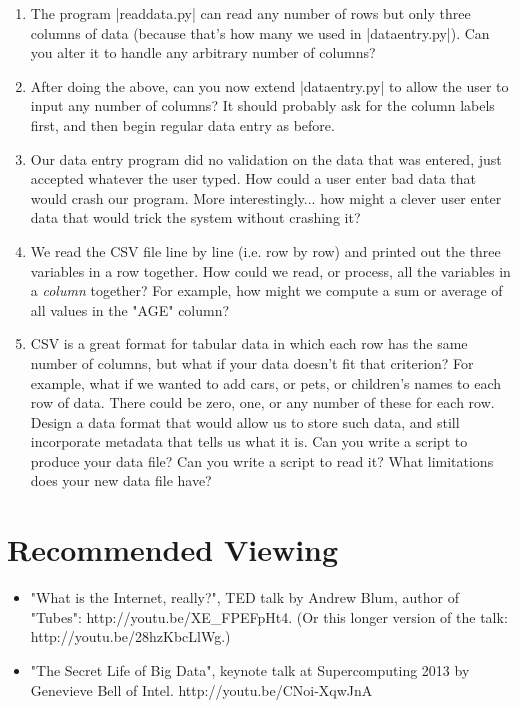 \documentclass[11pt]{book}
\begin{document}
\begin{enumerate}
    \item The program |readdata.py| can read any number of rows but only three columns of data (because that's how many we used in |dataentry.py|). Can you alter it to handle any arbitrary number of columns?
    \item After doing the above, can you now extend |dataentry.py| to allow the user to input any number of columns?  It should probably ask for the column labels first, and then begin regular data entry as before.
    \item Our data entry program did no validation on the data that was entered, just accepted whatever the user typed.  How could a user enter bad data that would crash our program.  More interestingly... how might a clever user enter data that would trick the system without crashing it?
    \item We read the CSV file line by line (i.e. row by row) and printed out the three variables in a row together.  How could we read, or process, all the variables in a \emph{column} together?  For example, how might we compute a sum or average of all values in the "AGE" column?
    \item CSV is a great format for tabular data in which each row has the same number of columns, but what if your data doesn't fit that criterion?  For example, what if we wanted to add cars, or pets, or children's names to each row of data.  There could be zero, one, or any number of these for each row.  Design a data format that would allow us to store such data, and still incorporate metadata that tells us what it is.  Can you write a script to produce your data file?  Can you write a script to read it?  What limitations does your new data file have?
\end{enumerate}

\section*{Recommended Viewing}
\begin{itemize}
    \item "What is the Internet, really?", TED talk by Andrew Blum, author of "Tubes": http://youtu.be/XE\_FPEFpHt4. (Or this longer version of the talk: http://youtu.be/28hzKbcLlWg.)
    \item "The Secret Life of Big Data", keynote talk at Supercomputing 2013 by Genevieve Bell of Intel. http://youtu.be/CNoi-XqwJnA
\end{itemize}
\end{document}
